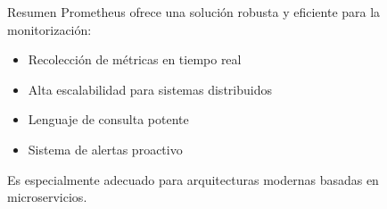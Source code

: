 \documentclass{beamer}
\begin{document}
\begin{frame}{Resumen}
Prometheus ofrece una solución robusta y eficiente para la monitorización:
\begin{itemize}
  \item Recolección de métricas en tiempo real
  \item Alta escalabilidad para sistemas distribuidos
  \item Lenguaje de consulta potente
  \item Sistema de alertas proactivo
\end{itemize}

Es especialmente adecuado para arquitecturas modernas basadas en microservicios.
\end{frame}
\end{document}
